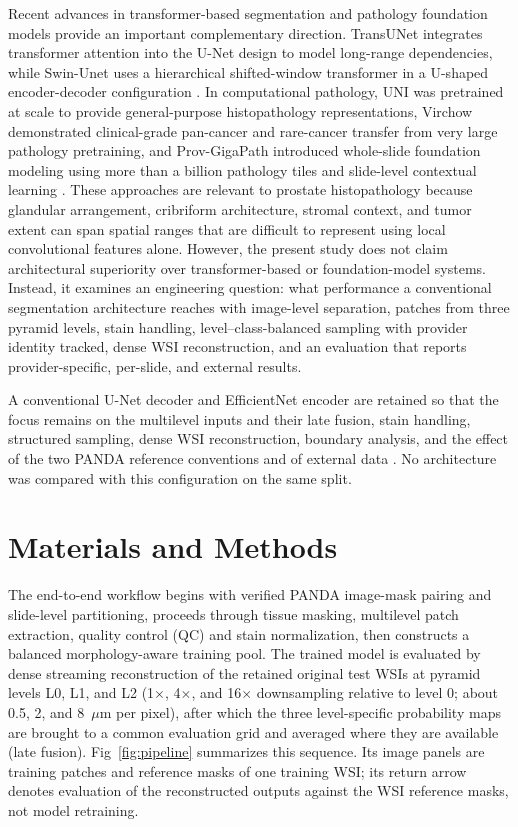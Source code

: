 \documentclass[10pt,letterpaper]{article}
\begin{document}
Recent advances in transformer-based segmentation and pathology foundation models provide an important complementary direction. TransUNet integrates transformer attention into the U-Net design to model long-range dependencies, while Swin-Unet uses a hierarchical shifted-window transformer in a U-shaped encoder-decoder configuration \cite{bib57,bib58}. In computational pathology, UNI was pretrained at scale to provide general-purpose histopathology representations, Virchow demonstrated clinical-grade pan-cancer and rare-cancer transfer from very large pathology pretraining, and Prov-GigaPath introduced whole-slide foundation modeling using more than a billion pathology tiles and slide-level contextual learning \cite{bib48,bib49,bib50}. These approaches are relevant to prostate histopathology because glandular arrangement, cribriform architecture, stromal context, and tumor extent can span spatial ranges that are difficult to represent using local convolutional features alone. However, the present study does not claim architectural superiority over transformer-based or foundation-model systems. Instead, it examines an engineering question: what performance a conventional segmentation architecture reaches with image-level separation, patches from three pyramid levels, stain handling, level--class-balanced sampling with provider identity tracked, dense WSI reconstruction, and an evaluation that reports provider-specific, per-slide, and external results.

A conventional U-Net decoder and EfficientNet encoder are retained so that the focus remains on the multilevel inputs and their late fusion, stain handling, structured sampling, dense WSI reconstruction, boundary analysis, and the effect of the two PANDA reference conventions and of external data \cite{bib29,bib30}. No architecture was compared with this configuration on the same split.

\section*{Materials and Methods}
The end-to-end workflow begins with verified PANDA image-mask pairing and slide-level partitioning, proceeds through tissue masking, multilevel patch extraction, quality control (QC) and stain normalization, then constructs a balanced morphology-aware training pool. The trained model is evaluated by dense streaming reconstruction of the retained original test WSIs at pyramid levels L0, L1, and L2 (1$\times$, 4$\times$, and 16$\times$ downsampling relative to level 0; about 0.5, 2, and 8~$\mu$m per pixel), after which the three level-specific probability maps are brought to a common evaluation grid and averaged where they are available (late fusion). Fig~\ref{fig:pipeline} summarizes this sequence. Its image panels are training patches and reference masks of one training WSI; its return arrow denotes evaluation of the reconstructed outputs against the WSI reference masks, not model retraining.
\end{document}
